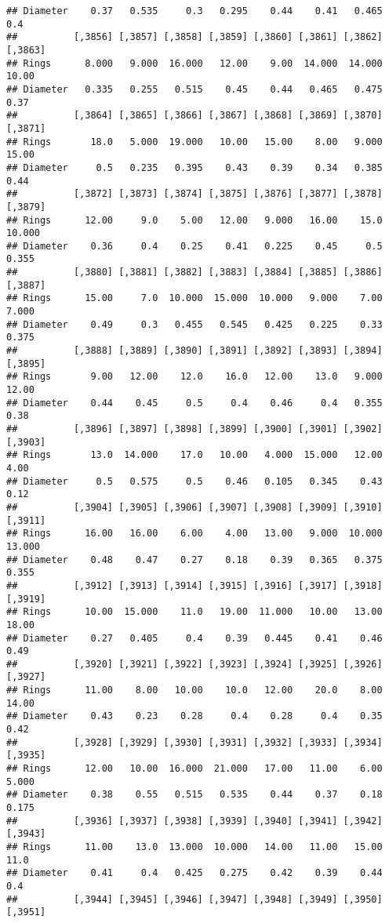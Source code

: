\documentclass[
]{article}
\begin{document}
\begin{verbatim}
## Diameter    0.37   0.535     0.3   0.295    0.44    0.41   0.465     0.4
##          [,3856] [,3857] [,3858] [,3859] [,3860] [,3861] [,3862] [,3863]
## Rings      8.000   9.000  16.000   12.00    9.00  14.000  14.000   10.00
## Diameter   0.335   0.255   0.515    0.45    0.44   0.465   0.475    0.37
##          [,3864] [,3865] [,3866] [,3867] [,3868] [,3869] [,3870] [,3871]
## Rings       18.0   5.000  19.000   10.00   15.00    8.00   9.000   15.00
## Diameter     0.5   0.235   0.395    0.43    0.39    0.34   0.385    0.44
##          [,3872] [,3873] [,3874] [,3875] [,3876] [,3877] [,3878] [,3879]
## Rings      12.00     9.0    5.00   12.00   9.000   16.00    15.0  10.000
## Diameter    0.36     0.4    0.25    0.41   0.225    0.45     0.5   0.355
##          [,3880] [,3881] [,3882] [,3883] [,3884] [,3885] [,3886] [,3887]
## Rings      15.00     7.0  10.000  15.000  10.000   9.000    7.00   7.000
## Diameter    0.49     0.3   0.455   0.545   0.425   0.225    0.33   0.375
##          [,3888] [,3889] [,3890] [,3891] [,3892] [,3893] [,3894] [,3895]
## Rings       9.00   12.00    12.0    16.0   12.00    13.0   9.000   12.00
## Diameter    0.44    0.45     0.5     0.4    0.46     0.4   0.355    0.38
##          [,3896] [,3897] [,3898] [,3899] [,3900] [,3901] [,3902] [,3903]
## Rings       13.0  14.000    17.0   10.00   4.000  15.000   12.00    4.00
## Diameter     0.5   0.575     0.5    0.46   0.105   0.345    0.43    0.12
##          [,3904] [,3905] [,3906] [,3907] [,3908] [,3909] [,3910] [,3911]
## Rings      16.00   16.00    6.00    4.00   13.00   9.000  10.000  13.000
## Diameter    0.48    0.47    0.27    0.18    0.39   0.365   0.375   0.355
##          [,3912] [,3913] [,3914] [,3915] [,3916] [,3917] [,3918] [,3919]
## Rings      10.00  15.000    11.0   19.00  11.000   10.00   13.00   18.00
## Diameter    0.27   0.405     0.4    0.39   0.445    0.41    0.46    0.49
##          [,3920] [,3921] [,3922] [,3923] [,3924] [,3925] [,3926] [,3927]
## Rings      11.00    8.00   10.00    10.0   12.00    20.0    8.00   14.00
## Diameter    0.43    0.23    0.28     0.4    0.28     0.4    0.35    0.42
##          [,3928] [,3929] [,3930] [,3931] [,3932] [,3933] [,3934] [,3935]
## Rings      12.00   10.00  16.000  21.000   17.00   11.00    6.00   5.000
## Diameter    0.38    0.55   0.515   0.535    0.44    0.37    0.18   0.175
##          [,3936] [,3937] [,3938] [,3939] [,3940] [,3941] [,3942] [,3943]
## Rings      11.00    13.0  13.000  10.000   14.00   11.00   15.00    11.0
## Diameter    0.41     0.4   0.425   0.275    0.42    0.39    0.44     0.4
##          [,3944] [,3945] [,3946] [,3947] [,3948] [,3949] [,3950] [,3951]

\end{verbatim}
\end{document}

